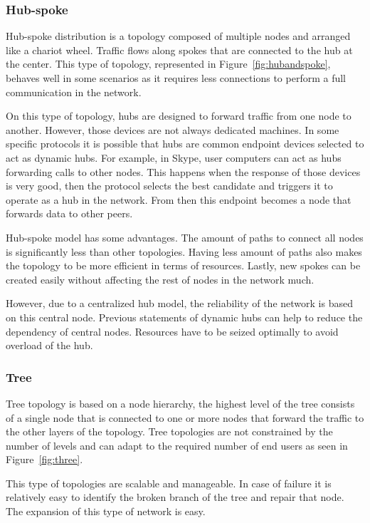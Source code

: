 \subsubsection{Hub-spoke}

Hub-spoke distribution is a topology composed of multiple nodes and arranged like a chariot wheel. Traffic flows along spokes that are connected to the hub at the center. This type of topology, represented in Figure~\ref{fig:hubandspoke}, behaves well in some scenarios as it requires less connections to perform a full communication in the network. 

On this type of topology, hubs are designed to forward traffic from one node to another. However, those devices are not always dedicated machines. In some specific protocols it is possible that hubs are common endpoint devices selected to act as dynamic hubs. For example, in Skype, user computers can act as hubs forwarding calls to other nodes. This happens when the response of those devices is very good, then the protocol selects the best candidate and triggers it to operate as a hub in the network. From then this endpoint becomes a node that forwards data to other peers. 

Hub-spoke model has some advantages. The amount of paths to connect all nodes is significantly less than other topologies. Having less amount of paths also makes the topology to be more efficient in terms of resources. Lastly, new spokes can be created easily without affecting the rest of nodes in the network much.

However, due to a centralized hub model, the reliability of the network is based on this central node. Previous statements of dynamic hubs can help to reduce the dependency of central nodes. Resources have to be seized optimally to avoid overload of the hub.

\subsubsection{Tree}
 
Tree topology is based on a node hierarchy, the highest level of the tree consists of a single node that is connected to one or more nodes that forward the traffic to the other layers of the topology. Tree topologies are not constrained by the number of levels and can adapt to the required number of end users as seen in Figure~\ref{fig:three}.  

This type of topologies are scalable and manageable. In case of failure it is relatively easy to identify the broken branch of the tree and repair that node. The expansion of this type of network is easy.

